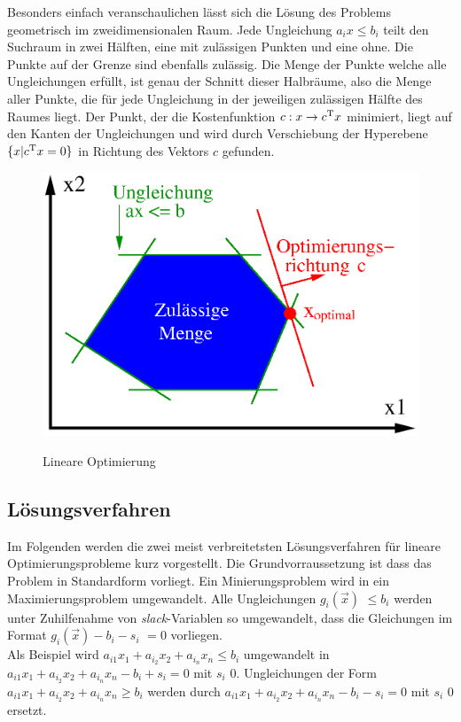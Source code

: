 \documentclass{like}
\begin{document}
Besonders einfach veranschaulichen lässt sich die Lösung des Problems geometrisch im zweidimensionalen Raum.
Jede Ungleichung $a_i x \leq b_i$ teilt den Suchraum in zwei Hälften, eine mit zulässigen Punkten und eine ohne. Die Punkte auf der Grenze sind ebenfalls zulässig. Die Menge der Punkte welche alle Ungleichungen erfüllt, ist genau der Schnitt dieser Halbräume, also die Menge aller Punkte, die für jede Ungleichung in der jeweiligen zulässigen Hälfte des Raumes liegt. 
Der Punkt, der die Kostenfunktion $c: x \rightarrow c\textsuperscript{T} x$ minimiert, liegt auf den Kanten der Ungleichungen und wird durch Verschiebung der Hyperebene $ \{x| c\textsuperscript{T} x = 0 \}$ in Richtung des Vektors \(c\) gefunden. 
\begin{figure}[ht!]
	\caption{Lineare Optimierung}
	\includegraphics[width=350pt]{Abbildungen/linOpt.png}
	\label{fig:linOpt}
\end{figure}

 \subsection*{Lösungsverfahren}
 Im Folgenden werden die zwei meist verbreitetsten Lösungsverfahren für lineare Optimierungsprobleme kurz vorgestellt. 
 Die Grundvorraussetzung ist dass das Problem in Standardform vorliegt. Ein Minierungsproblem wird in ein Maximierungsproblem umgewandelt.
 Alle Ungleichungen $g_i(\vec{x})$ $\leq b_i$ werden unter Zuhilfenahme von \textit{slack}-Variablen so umgewandelt, dass die Gleichungen im Format $g_i(\vec{x}) - b_i -s_i$ $=  0$ vorliegen. \\
 Als Beispiel wird $a_{i1}x_1 + a_i_2 x_2 + a_i_n x_n\leq b_i$ umgewandelt in 
 $a_{i1}x_1 + a_i_2 x_2 + a_i_n x_n - b_i +s_i = 0$ mit \(s_i\) \geq \(0\).
 Ungleichungen der Form $a_{i1}x_1 + a_i_2 x_2 + a_i_n x_n\geq b_i$ werden  durch  
 $a_{i1}x_1 + a_i_2 x_2 + a_i_n x_n - b_i - s_i = 0$ mit \(s_i\) \geq \(0\) ersetzt.
 
\end{document}
